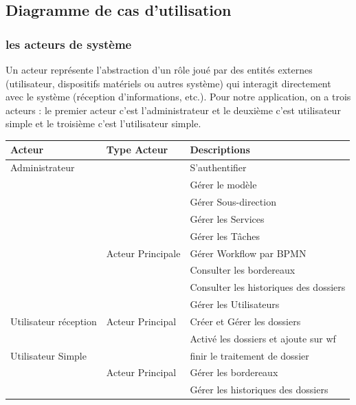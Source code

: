  
 
 
 
 
 
 
 
 
 
\subsection{ Diagramme de cas d’utilisation }
 
  \subsubsection{ les acteurs de système  }
 
Un acteur représente l'abstraction d'un rôle joué par des entités externes (utilisateur, dispositifs matériels ou autres système) qui interagit directement avec le système (réception d’informations, etc.). Pour notre application, on a trois acteurs : le premier acteur c'est l'administrateur et le deuxième c'est utilisateur simple et le troisième c'est l'utilisateur simple.
\begin{table}[H]
	\begin{tabular}{|l|l|l|}
		\hline
		\multicolumn{1}{|l|}{Acteur} & Type Acteur & Descriptions \\ \hline
	Administrateur	 &  & S’authentifier \\ \cline{3-3} 
		&  &Gérer le modèle\\ \cline{3-3} 
		&  & Gérer Sous-direction \\ \cline{3-3} 
	 	&  & Gérer les Services \\ \cline{3-3} 	
	 	&  & Gérer les Tâches \\ \cline{3-3} 
 
		& Acteur Principale & Gérer Workflow par BPMN  \\ \cline{3-3} 
				&  &Consulter les bordereaux   \\ \cline{3-3} 
						&  &Consulter les historiques des dossiers\\ \cline{3-3} 
								&  & Gérer les Utilisateurs \\ \hline 
		
  
			Utilisateur réception	 	&Acteur Principal & Créer et Gérer les dossiers  \\ \cline{3-3}  
		&  & Activé les dossiers et ajoute sur wf \\ \hline
 
		Utilisateur Simple	&  & finir le traitement de dossier  \\ \cline{3-3} 
		&  Acteur Principal& Gérer les bordereaux  \\ \cline{3-3} 
		&  &Gérer les historiques des dossiers\\ \hline 
	\end{tabular}
\end{table}
 
